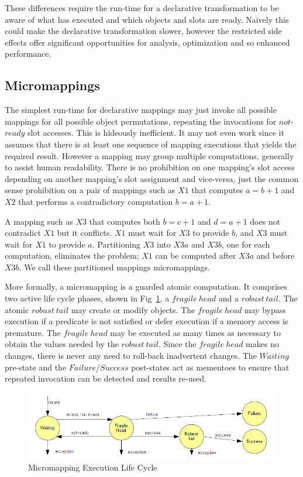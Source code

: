 \documentclass{llncs}
\begin{document}
These differences require the run-time for a declarative transformation to be aware of what has executed and which objects and slots are ready. Naively this could make the declarative transformation slower, however the restricted side effects offer significant opportunities for analysis, optimization and so enhanced performance.

\subsection{Micromappings}

The simplest run-time for declarative mappings may just invoke all possible mappings for all possible object permutations, repeating the invocations for $not$-$ready$ slot accesses. This is hideously inefficient. It may not even work since it assumes that there is at least one sequence of mapping executions that yields the required result. However a mapping may group multiple computations, generally to assist human readability. There is no prohibition on one mapping's slot access depending on another mapping's slot assignment and vice-versa, just the common sense prohibition on a pair of mappings such as $X1$ that computes $a = b + 1$ and $X2$ that performs a contradictory computation $b = a + 1$.
 
A mapping such as $X3$ that computes both $b = c + 1$ and $d = a + 1$ does not contradict $X1$ but it conflicts. $X1$ must wait for $X3$ to provide $b$, and $X3$ must wait for $X1$ to provide $a$. Partitioning $X3$ into $X3a$ and $X3b$, one for each computation, eliminates the problem; $X1$ can be computed after $X3a$ and before $X3b$. We call these partitioned mappings micromappings.

More formally, a micromapping is a guarded atomic computation. It comprises two active life cycle phases, shown in Fig~\ref{fig:MicromappingContext}, a $fragile\ head$ and a $robust\ tail$. The atomic $robust\ tail$ may create or modify objects. The $fragile\ head$ may bypass execution if a predicate is not satisfied or defer execution if a memory access is premature. The $fragile\ head$ may be executed as many times as necessary to obtain the values needed by the $robust\ tail$. Since the $fragile\ head$ makes no changes, there is never any need to roll-back inadvertent changes. The $Waiting$ pre-state and the $Failure$/$Success$ post-states act as mementoes to ensure that repeated invocation can be detected and results re-used.

\begin{figure}
  \begin{center}
    \includegraphics[width=4.75in]{MicromappingContext.png}
  \end{center}
  \caption{Micromapping Execution Life Cycle}
  \label{fig:MicromappingContext}
\end{figure}
\end{document}
